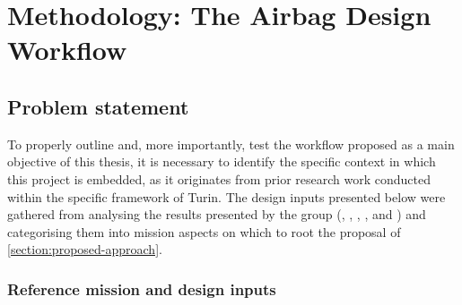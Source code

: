 \chapter{Methodology: The Airbag Design Workflow}
\label{chapter:methodology}


\section{Problem statement}
To properly outline and, more importantly, test the workflow proposed as a main objective of this thesis, it is necessary to identify the specific context in which this project is embedded, as it originates from prior research work conducted within the specific framework of Turin. The design inputs presented below were gathered from analysing the results presented by the group (\cite{Cavallo2020}, \cite{Bertelli2021}, \cite{Sivieri2021}, \cite{Fiorentino2021}, and \cite{Angelini2023}) and categorising them into mission aspects on which to root the proposal of \cref{section:proposed-approach}.

\subsection{Reference mission and design inputs}\label{sec:reference-mission}
